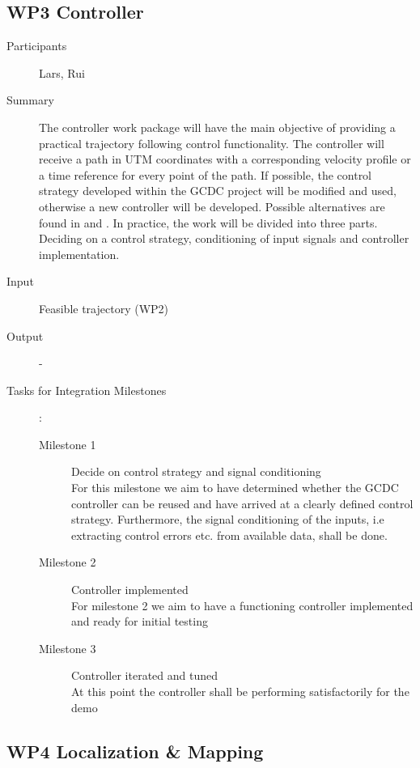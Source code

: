 \documentclass[11pt,a4paper]{article}
\begin{document}
\subsection{WP3 Controller}

\begin{description}
\item[Participants] Lars, Rui
\item[Summary]
The controller work package will have the main objective of providing a practical trajectory following control functionality. The controller will receive a path in UTM coordinates with a corresponding velocity profile or a time reference for every point of the path. If possible, the control strategy developed within the GCDC project will be modified and used, otherwise a new controller will be developed. Possible alternatives are found in \cite{werling2010tracking} and \cite{lima2015}. In practice, the work will be divided into three parts. Deciding on a control strategy, conditioning of input signals and controller implementation. 
\item[Input]
Feasible trajectory (WP2)
\item[Output] -
\item[Tasks for Integration Milestones]:\
	\begin{description}
		\item[Milestone 1] Decide on control strategy and signal conditioning \\
			For this milestone we aim to have determined whether the GCDC controller can be reused 
			and have arrived at a clearly defined control strategy. Furthermore, the signal conditioning 
			of the inputs, i.e extracting control errors etc. from available data, shall be done. 
		\item[Milestone 2] Controller implemented\\
			For milestone 2 we aim to have a functioning controller implemented and ready for initial testing
		\item[Milestone 3] Controller iterated and tuned\\
			At this point the controller shall be performing satisfactorily for the demo
	\end{description}	 
\end{description}

\subsection{WP4 Localization \& Mapping}
\end{document}
